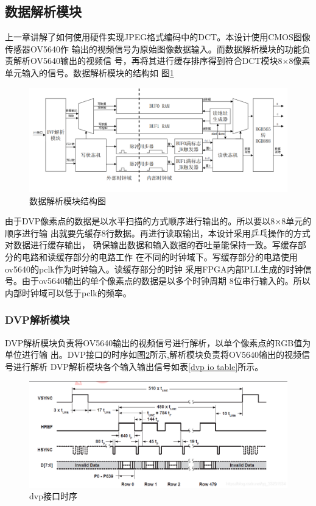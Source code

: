 \documentclass{article}
\numberwithin {equation}{section}
\begin{document}
\begin{spacing}{1.25}
  \subsection{数据解析模块}
    \vspace{1em}
    上一章讲解了如何使用硬件实现JPEG格式编码中的DCT。本设计使用CMOS图像传感器OV5640作
    输出的视频信号为原始图像数据输入。而数据解析模块的功能负责解析OV5640输出的视频信
    号，再将其进行缓存排序得到符合DCT模块8×8像素单元输入的信号。数据解析模块的结构如
    图\ref{data parser}
    \begin{figure}[H]
      \centering
      \includegraphics[scale=0.35]{./pictures/数据解析模块.png}
      \caption{数据解析模块结构图}
      \label{data parser}
    \end{figure}

    由于DVP像素点的数据是以水平扫描的方式顺序进行输出的。所以要以8×8单元的顺序进行输
    出就要先缓存8行数据。再进行读取输出，本设计采用乒乓操作的方式对数据进行缓存输出，
    确保输出数据和输入数据的吞吐量能保持一致。写缓存部分的电路和读缓存部分的电路工作
    在不同的时钟域下。写缓存部分的电路使用ov5640的pclk作为时钟输入。读缓存部分的时钟
    采用FPGA内部PLL生成的时钟信号。由于ov5640输出的单个像素点的数据是以多个时钟周期
    8位串行输入的。所以内部时钟域可以低于pclk的频率。
    \subsubsection{DVP解析模块}
      \vspace{1em}
      DVP解析模块负责将OV5640输出的视频信号进行解析，以单个像素点的RGB值为单位进行输
      出。DVP接口的时序如图\ref{dvp}所示,解析模块负责将OV5640输出的视频信号进行解析
      DVP解析模块各个输入输出信号如表\ref{dvp io table}所示。
      \begin{figure}[H]
        \centering
        \includegraphics[scale=0.4]{./pictures/dvp时序.png}
        \caption{dvp接口时序}
        \label{dvp}
      \end{figure}


\end{spacing}
\end{document}
